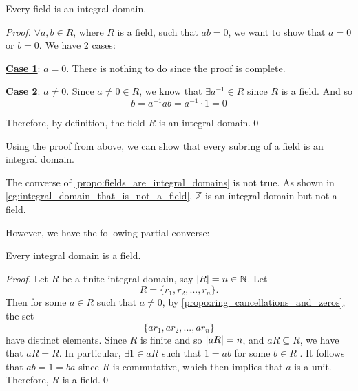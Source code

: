 \begin{propo}
\label{propo:fields_are_integral_domains}
Every field is an integral domain.
\end{propo}

\begin{proof}
  $\forall a, b \in R$, where $R$ is a field, such that $ab = 0$, we want to show that $a = 0$ or $b = 0$. We have 2 cases:

  \noindent \underline{\textbf{Case 1}}: $a = 0$. There is nothing to do since the proof is complete.

  \noindent \underline{\textbf{Case 2}}: $a \neq 0$. Since $a \neq 0 \in R$, we know that $\exists a^{-1} \in R$ since $R$ is a field. And so
  \begin{equation*}
    b = a^{-1} ab = a^{-1} \cdot 1 = 0
  \end{equation*}
  
  Therefore, by definition, the field $R$ is an integral domain.\qed
\end{proof}

\begin{note}
  Using the proof from above, we can show that every subring of a field is an integral domain.
\end{note}

\begin{note}
  The converse of \cref{propo:fields_are_integral_domains} is not true. As shown in \cref{eg:integral_domain_that_is_not_a_field}, $\mathbb{Z}$ is an integral domain but not a field.
\end{note}

However, we have the following partial converse:

\begin{propo}
\label{propo:finite_integral_domains_are_fields}
  Every  integral domain is a field.
\end{propo}

\begin{proof}
  Let $R$ be a finite integral domain, say $\left|R\right| = n \in \mathbb{N}$. Let
  \begin{equation*}
    R = \{r_1, r_2, ..., r_n\}.
  \end{equation*}
  Then for some $a \in R$ such that $a \neq 0$, by \cref{propo:ring_cancellations_and_zeros}, the set
  \begin{equation*}
    \{ ar_1, ar_2, ..., ar_n \}
  \end{equation*}
  have distinct elements. Since $R$ is finite and so $\left|aR\right| = n$, and $aR \subseteq R$, we have that $aR = R$. In particular, $\exists 1 \in aR$ such that $1 = ab$ for some $b \in R$ . It follows that $ab = 1 = ba$ since $R$ is commutative, which then implies that $a$ is a unit. Therefore, $R$ is a field.\qed
\end{proof}

